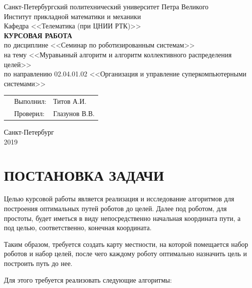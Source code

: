 \documentclass{article}
\begin{document}
    \thispagestyle{empty}
	\begin{center}
		Санкт-Петербургский политехнический университет Петра Великого\\
		Институт прикладной математики и механики\\
		Кафедра <<Телематика (при ЦНИИ РТК)>>\\
		\vspace*{\fill}
		\textbf{\Large{КУРСОВАЯ РАБОТА}}\\
		\vspace{0.5cm}
        \large{по дисциплине <<Семинар по роботизированным системам>>\\}
        \large{на тему <<Муравьиный алгоритм и алгоритм коллективного распределения целей>>}\\
        \vspace{1cm}
        по направлению 02.04.01.02 <<Организация и управление суперкомпьютерными системами>>
	\end{center}
	\vspace{3cm}
	\begin{tabular} {l l l}
	\hspace{10cm} & Выполнил: & Титов А.И.\\
	& Проверил: & Глазунов В.В.
	\end{tabular}
	\vspace*{\fill}
	\begin{center}
		Санкт-Петербург\\
		2019
    \end{center}
    \newpage


	\renewcommand\contentsname{Оглавление}
	\tableofcontents

	\newpage
	\section*{ПОСТАНОВКА ЗАДАЧИ}

	Целью курсовой работы является реализация и исследование алгоритмов для построения оптимальных путей роботов до целей. Далее под роботом, для простоты, будет иметься в виду непосредственно начальная координата пути, а под целью, соответственно, конечная координата.

	Таким образом, требуется создать карту местности, на которой помещается набор роботов и набор целей, после чего каждому роботу оптимально назначить цель и построить путь до нее.

	Для этого требуется реализовать следующие алгоритмы:
\end{document}
